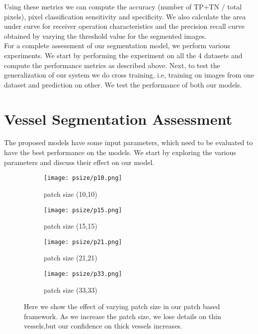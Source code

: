 Using these metrics we can compute the accuracy (number of TP+TN / total pixels), pixel classification sensitivity and specificity. We also calculate the area under curve for receiver operation characteristics and the precision recall curve obtained by varying the threshold value for the segmented images.\\

For a complete assessment of our segmentation model, we perform various experiments. We start by performing the experiment on all the 4 datasets and compute the performance metrics as described above. Next, to test the generalization of our system we do cross training, i.e, training on images from one dataset and prediction on other. We test the performance of both our models.  	

\section{Vessel Segmentation Assessment}
The proposed models have some input parameters, which need to be evaluated to have the best performance on the models. We start by exploring the various parameters and discuss their effect on our model.\\
\begin{figure}
	\begin{subfigure}[b]{0.45\textwidth}
		\texttt{[image: psize/p10.png]}
		\caption{patch size (10,10)}
		\label{fig:p10}
	\end{subfigure}
	\begin{subfigure}[b]{0.45\textwidth}
		\texttt{[image: psize/p15.png]}
		\caption{patch size (15,15)}
		\label{fig:p15}
	\end{subfigure}
	
	\begin{subfigure}[b]{0.45\textwidth}
		\texttt{[image: psize/p21.png]}
		\caption{patch size (21,21)}
		\label{fig:p21}
	\end{subfigure}
	\begin{subfigure}[b]{0.45\textwidth}
		\texttt{[image: psize/p33.png]}
		\caption{patch size (33,33)}
		\label{fig:33}
	\end{subfigure}
	\caption[Image segmentation using varying patch sizes]{Here we show the effect of varying patch size in our patch based framework. As we increase the patch size, we lose details on thin vessels,but our confidence on thick vessels increases.}
	\label{fig:patch size}
\end{figure}

